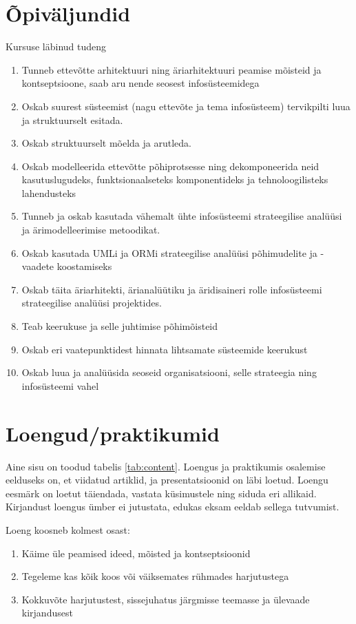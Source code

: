 \documentclass[nobib]{tufte-handout}
\begin{document}
\section{Õpiväljundid}
Kursuse läbinud tudeng 
\begin{enumerate}
	\item Tunneb ettevõtte arhitektuuri ning äriarhitektuuri peamise mõisteid ja kontseptsioone, saab aru nende seosest infosüsteemidega 
	\item Oskab suurest süsteemist (nagu ettevõte ja tema infosüsteem) tervikpilti luua ja struktuurselt esitada. 
	\item Oskab struktuurselt mõelda ja arutleda. 
	\item Oskab modelleerida ettevõtte põhiprotsesse ning dekomponeerida neid kasutuslugudeks, funktsionaalseteks komponentideks ja tehnoloogilisteks lahendusteks
	\item Tunneb ja oskab kasutada vähemalt ühte infosüsteemi strateegilise analüüsi ja ärimodelleerimise metoodikat. 
	\item Oskab kasutada UMLi ja ORMi strateegilise analüüsi põhimudelite ja -vaadete koostamiseks 
	\item Oskab täita äriarhitekti, ärianalüütiku ja äridisaineri rolle infosüsteemi strateegilise analüüsi projektides. 
	\item Teab keerukuse ja selle juhtimise põhimõisteid
	\item Oskab eri vaatepunktidest hinnata lihtsamate süsteemide keerukust
	\item Oskab luua ja analüüsida seoseid organisatsiooni, selle strateegia ning infosüsteemi vahel
\end{enumerate}

\section{Loengud/praktikumid}
Aine sisu on toodud tabelis \ref{tab:content}. Loengus ja praktikumis osalemise eelduseks on, et viidatud artiklid, ja presentatsioonid on läbi loetud. Loengu eesmärk on loetut täiendada, vastata küsimustele ning siduda eri allikaid. Kirjandust loengus ümber ei jutustata, edukas eksam eeldab sellega tutvumist. 

Loeng koosneb kolmest osast:
\begin{enumerate}
	\item Käime üle peamised ideed, mõisted ja kontseptsioonid
	\item Tegeleme kas kõik koos või väiksemates rühmades harjutustega
	\item Kokkuvõte harjutustest, sissejuhatus järgmisse teemasse ja ülevaade kirjandusest
\end{enumerate}
\end{document}
